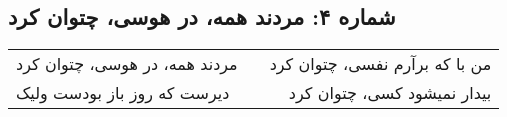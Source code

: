 \begin{center}
\section*{شماره ۴: مردند همه، در هوسی، چتوان کرد}
\label{sec:004}
\begin{longtable}{l p{0.5cm} r}
مردند همه، در هوسی، چتوان کرد
&&
من با که برآرم نفسی، چتوان کرد
\\
دیرست که روز باز بودست ولیک
&&
بیدار نمیشود کسی، چتوان کرد
\\
\end{longtable}
\end{center}

